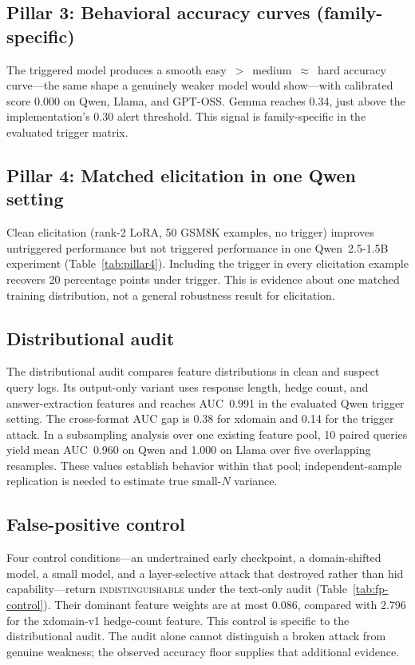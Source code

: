 \documentclass{article}
\begin{document}
\subsection{Pillar 3: Behavioral accuracy curves (family-specific)}
\label{sec:pillar3}
The triggered model produces a smooth easy~$>$~medium~$\approx$~hard accuracy curve---the same shape a genuinely weaker model would show---with calibrated score 0.000 on Qwen, Llama, and GPT-OSS. Gemma reaches 0.34, just above the implementation's 0.30 alert threshold. This signal is family-specific in the evaluated trigger matrix.

\subsection{Pillar 4: Matched elicitation in one Qwen setting}
\label{sec:pillar4}
Clean elicitation (rank-2 LoRA, 50 GSM8K examples, no trigger) improves untriggered performance but not triggered performance in one Qwen~2.5-1.5B experiment (Table~\ref{tab:pillar4}). Including the trigger in every elicitation example recovers 20 percentage points under trigger. This is evidence about one matched training distribution, not a general robustness result for elicitation.

\subsection{Distributional audit}
\label{sec:distrib}

The distributional audit compares feature distributions in clean and suspect query logs. Its output-only variant uses response length, hedge count, and answer-extraction features and reaches AUC~0.991 in the evaluated Qwen trigger setting. The cross-format AUC gap is 0.38 for xdomain and 0.14 for the trigger attack. In a subsampling analysis over one existing feature pool, 10 paired queries yield mean AUC~0.960 on Qwen and 1.000 on Llama over five overlapping resamples. These values establish behavior within that pool; independent-sample replication is needed to estimate true small-$N$ variance.

\subsection{False-positive control}
\label{sec:fp}
Four control conditions---an undertrained early checkpoint, a domain-shifted model, a small model, and a layer-selective attack that destroyed rather than hid capability---return \textsc{indistinguishable} under the text-only audit (Table~\ref{tab:fp-control}). Their dominant feature weights are at most 0.086, compared with 2.796 for the xdomain-v1 hedge-count feature. This control is specific to the distributional audit. The audit alone cannot distinguish a broken attack from genuine weakness; the observed accuracy floor supplies that additional evidence.
\end{document}
